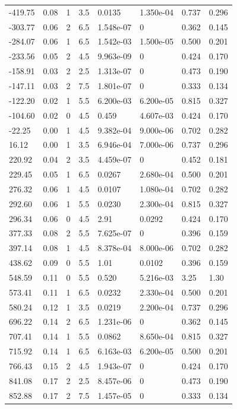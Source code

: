 \documentclass[preview]{standalone}
\begin{document}
{{\begin{tabular}{L{1.2cm}C{1.2cm} C{0.3cm}C{0.5cm} C{1.4cm}C{1.4cm} C{1.4cm}C{1.4cm}}
  -419.75  &  0.08  & 1     & 3.5 &  0.0135  & 1.350e-04  & 0.737 &  0.296   \\ 
  -303.77  &  0.06  & 2     & 6.5 &  1.548e-07  & 0  & 0.362 &  0.145   \\ 
  -284.07  &  0.06  & 1     & 6.5 &  1.542e-03  & 1.500e-05  & 0.500 &  0.201   \\ 
  -233.56  &  0.05  & 2     & 4.5 &  9.963e-09  & 0  & 0.424 &  0.170   \\ 
  -158.91  &  0.03  & 2     & 2.5 &  1.313e-07  & 0  & 0.473 &  0.190   \\ 
  -147.11  &  0.03  & 2     & 7.5 &  1.801e-07  & 0  & 0.333 &  0.134   \\ 
  -122.20  &  0.02  & 1     & 5.5 &  6.200e-03  & 6.200e-05  & 0.815 &  0.327   \\ 
  -104.60  &  0.02  & 0     & 4.5 &  0.459  & 4.607e-03  & 0.424 &  0.170   \\ 
  -22.25  &  0.00  & 1     & 4.5 &  9.382e-04  & 9.000e-06  & 0.702 &  0.282   \\ 
  16.12  &  0.00  & 1     & 3.5 &  6.946e-04  & 7.000e-06  & 0.737 &  0.296   \\ 
  220.92  &  0.04  & 2     & 3.5 &  4.459e-07  & 0  & 0.452 &  0.181   \\ 
  229.45  &  0.05  & 1     & 6.5 &  0.0267  & 2.680e-04  & 0.500 &  0.201   \\ 
  276.32  &  0.06  & 1     & 4.5 &  0.0107  & 1.080e-04  & 0.702 &  0.282   \\ 
  292.60  &  0.06  & 1     & 5.5 &  0.0230  & 2.300e-04  & 0.815 &  0.327   \\ 
  296.34  &  0.06  & 0     & 4.5 &  2.91  & 0.0292  & 0.424 &  0.170   \\ 
  377.33  &  0.08  & 2     & 5.5 &  7.625e-07  & 0  & 0.396 &  0.159   \\ 
  397.14  &  0.08  & 1     & 4.5 &  8.378e-04  & 8.000e-06  & 0.702 &  0.282   \\ 
  438.62  &  0.09  & 0     & 5.5 &  1.01  & 0.0102  & 0.396 &  0.159   \\ 
  548.59  &  0.11  & 0     & 5.5 &  0.520  & 5.216e-03  & 3.25 &  1.30   \\ 
  573.41  &  0.11  & 1     & 6.5 &  0.0232  & 2.330e-04  & 0.500 &  0.201   \\ 
  580.24  &  0.12  & 1     & 3.5 &  0.0219  & 2.200e-04  & 0.737 &  0.296   \\ 
  696.22  &  0.14  & 2     & 6.5 &  1.231e-06  & 0  & 0.362 &  0.145   \\ 
  707.41  &  0.14  & 1     & 5.5 &  0.0862  & 8.650e-04  & 0.815 &  0.327   \\ 
  715.92  &  0.14  & 1     & 6.5 &  6.163e-03  & 6.200e-05  & 0.500 &  0.201   \\ 
  766.43  &  0.15  & 2     & 4.5 &  1.943e-07  & 0  & 0.424 &  0.170   \\ 
  841.08  &  0.17  & 2     & 2.5 &  8.457e-06  & 0  & 0.473 &  0.190   \\ 
  852.88  &  0.17  & 2     & 7.5 &  1.457e-05  & 0  & 0.333 &  0.134   \\ 
\hline 
\end{tabular} 

}}
\end{document}
